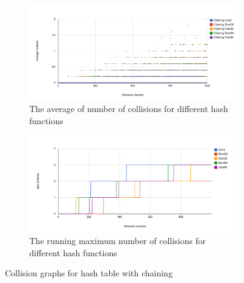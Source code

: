 \documentclass[11pt]{article}
\begin{document}
\begin{figure}
        \begin{subfigure}[b]{1\textwidth}
                \centering
                \includegraphics[width=\textwidth]{chaining-collision.png}
                \caption{The average of number of collisions for different hash functions}
                \label{fig:chaining-collision}
        \end{subfigure}

         \begin{subfigure}[b]{1\textwidth}
                \centering
                \includegraphics[width=\textwidth]{max-query-chaining.png}
                \caption{The running maximum number of collisions for different hash functions}
                \label{fig:chaining-max}
        \end{subfigure}
        \caption{Collision graphs for hash table with chaining}\label{fig:chaining}
\end{figure}
\end{document}
